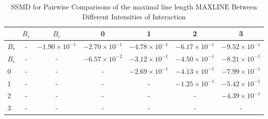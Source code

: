 \begin{table*}[!t]
\caption{SSMD for Pairwise Comparisons of the maximal line length $\text{MAXLINE}$  Between Different Intensities of Interaction\label{tab:ssmd_maxline}}
\centering
\begin{tabular}{lcccccc}
\toprule
 & $B_r$ & $B_c$ & 0 & 1 & 2 & 3 \\
\midrule
$B_r$ & - & $-1.90 \times 10^{-1}$ & $-2.70 \times 10^{-1}$ & $-4.78 \times 10^{-1}$ & $-6.17 \times 10^{-1}$ & $-9.52 \times 10^{-1}$ \\
$B_c$ & - & - & $-6.57 \times 10^{-2}$ & $-3.12 \times 10^{-1}$ & $-4.50 \times 10^{-1}$ & $-8.21 \times 10^{-1}$ \\
0 & - & - & - & $-2.69 \times 10^{-1}$ & $-4.13 \times 10^{-1}$ & $-7.99 \times 10^{-1}$ \\
1 & - & - & - & - & $-1.25 \times 10^{-1}$ & $-5.42 \times 10^{-1}$ \\
2 & - & - & - & - & - & $-4.39 \times 10^{-1}$ \\
3 & - & - & - & - & - & - \\
\bottomrule
\end{tabular}
\end{table*}
